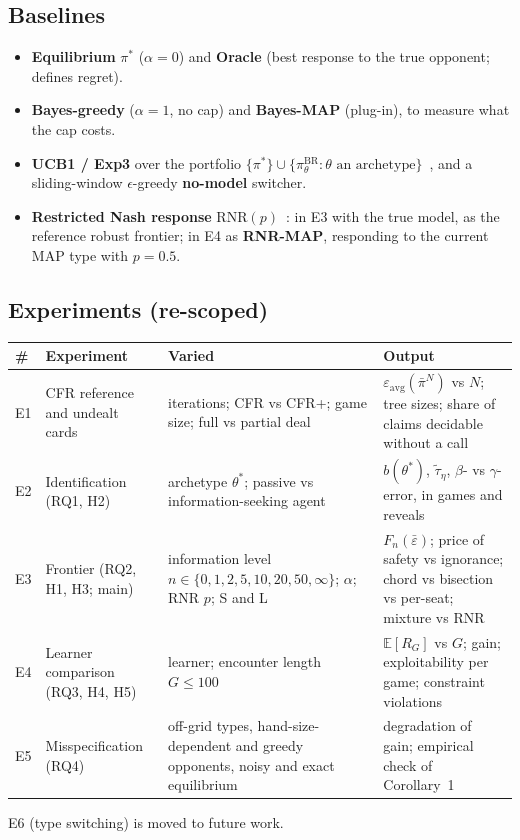 \documentclass[11pt]{article}
\newcommand{\eps}{\varepsilon}
\newcommand{\epsbar}{\bar{\eps}}
\newcommand{\BR}{\mathrm{BR}}
\newcommand{\new}[1]{\textcolor{blue!55!black}{#1}}
\begin{document}
\subsection{Baselines}
\begin{itemize}
\item \textbf{Equilibrium} $\pi^*$ ($\alpha=0$) and \textbf{Oracle} (best response to the true opponent; defines regret).
\item \textbf{Bayes-greedy} ($\alpha=1$, no cap) and \textbf{Bayes-MAP} (plug-in), to measure what the cap costs.
\item \textbf{UCB1 / Exp3} over the portfolio $\{\pi^*\}\cup\{\pi^{\BR}_\theta:\theta\text{ an archetype}\}$~\cite{auer2002ucb,auer2002exp3}, and a sliding-window $\epsilon$-greedy \textbf{no-model} switcher.
\item \textbf{Restricted Nash response} $\mathrm{RNR}(p)$~\cite{johanson2007}: in E3 with the true model, as the reference robust frontier; in E4 as \textbf{RNR-MAP}, responding to the current MAP type with $p=0.5$.
\end{itemize}

\subsection{Experiments \new{(re-scoped)}}
\begin{center}\small
\begin{tabularx}{\linewidth}{@{}l>{\raggedright\arraybackslash}p{3cm}>{\raggedright\arraybackslash}p{3.6cm}X@{}}
\toprule
\# & Experiment & Varied & Output\\\midrule
E1 & CFR reference \new{and undealt cards} & iterations; CFR vs CFR+; game size; \new{full vs partial deal} & $\eps_{\mathrm{avg}}(\bar\pi^N)$ vs $N$; tree sizes; \new{share of claims decidable without a call}\\
E2 & Identification (RQ1, H2) & archetype $\theta^*$; passive vs information-seeking agent & $b(\theta^*)$, $\tilde\tau_\eta$, $\beta$- vs $\gamma$-error, in games and reveals\\
E3 & Frontier (RQ2, H1, H3; main) & \new{information level} $n\in\{0,1,2,5,10,20,50,\infty\}$; $\alpha$; RNR $p$; S and L & $F_n(\epsbar)$; price of safety vs ignorance; chord vs bisection vs per-seat; mixture vs RNR\\
E4 & Learner comparison (RQ3, H4, H5) & learner; \new{encounter length $G\le100$} & $\mathbb E[R_G]$ vs $G$; gain; exploitability per game; \new{constraint violations}\\
E5 & Misspecification (RQ4) & off-grid types, hand-size-dependent and greedy opponents, noisy and exact equilibrium & degradation of gain; \new{empirical check of Corollary~1}\\
\bottomrule
\end{tabularx}\end{center}
\new{E6 (type switching) is moved to future work.}
\end{document}
